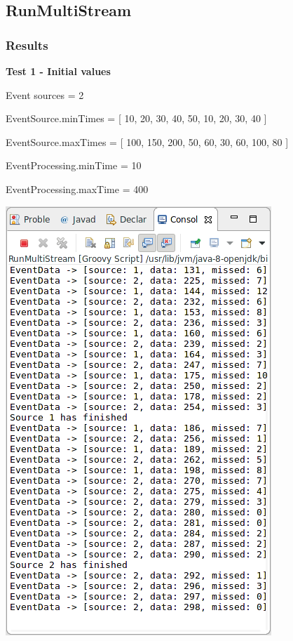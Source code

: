 \subsection{RunMultiStream}

\subsubsection*{Results}

\textbf{Test 1 - Initial values}

Event sources = 2

EventSource.minTimes = [ 10, 20, 30, 40, 50, 10, 20, 30, 40 ]

EventSource.maxTimes = [ 100, 150, 200, 50, 60, 30, 60, 100, 80 ]

EventProcessing.minTime = 10

EventProcessing.maxTime = 400

\includegraphics[width=\textwidth/2]{img/screenshots/9-2-1.png}

